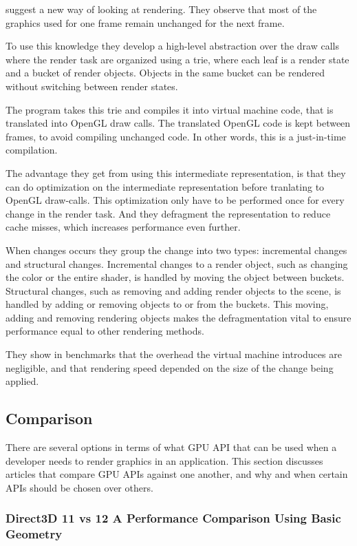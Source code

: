 \noindent \citet{haaser_2015_incremental} suggest a new way of looking at rendering.
They observe that most of the graphics used for one frame remain unchanged for the next frame.

To use this knowledge they develop a high-level abstraction over the draw calls where the render task are organized using a trie, where each leaf is a render state and a bucket of render objects.
Objects in the same bucket can be rendered without switching between render states.

The program takes this trie and compiles it into virtual machine code, that is translated into OpenGL draw calls.
The translated OpenGL code is kept between frames, to avoid compiling unchanged code.
In other words, this is a just-in-time compilation.

The advantage they get from using this intermediate representation, is that they can do optimization on the intermediate representation before tranlating to OpenGL draw-calls.
This optimization only have to be performed once for every change in the render task.
And they defragment the representation to reduce cache misses, which increases performance even further.

When changes occurs they group the change into two types: incremental changes and structural changes.
Incremental changes to a render object, such as changing the color or the entire shader, is handled by moving the object between buckets.
Structural changes, such as removing and adding render objects to the scene, is handled by adding or removing objects to or from the buckets.
This moving, adding and removing rendering objects makes the defragmentation vital to ensure performance equal to other rendering methods.

They show in benchmarks that the overhead the virtual machine introduces are negligible, and that rendering speed depended on the size of the change being applied. 

\subsection{Comparison}
There are several options in terms of what \gls{GPU} \gls{API} that can be used when a developer needs to render graphics in an application. This section discusses articles that compare \gls{GPU} \glspl{API} against one another, and why and when certain \glspl{API} should be chosen over others.

\subsubsection{Direct3D 11 vs 12 A Performance Comparison Using Basic Geometry}

